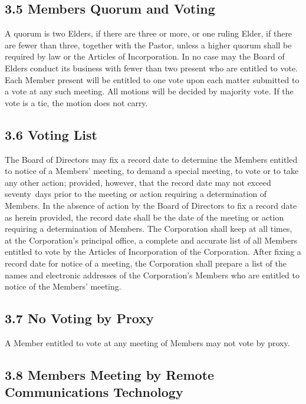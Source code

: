 \documentclass[
]{book}
\begin{document}
\subsection{3.5 Members Quorum and Voting}\label{members-quorum-and-voting}

A quorum is two Elders, if there are three or more, or one ruling
Elder, if there are fewer than three, together with the Pastor, unless
a higher quorum shall be required by law or the Articles of
Incorporation. In no case may the Board of Elders conduct its business
with fewer than two present who are entitled to vote. Each Member
present will be entitled to one vote upon each matter submitted to a
vote at any such meeting. All motions will be decided by majority
vote. If the vote is a tie, the motion does not carry.

\subsection{3.6 Voting List}\label{voting-list}

The Board of Directors may fix a record date to determine the Members
entitled to notice of a Members' meeting, to demand a special meeting,
to vote or to take any other action; provided, however, that the
record date may not exceed seventy~days prior to the meeting or action
requiring a determination of Members. In the absence of action by the
Board of Directors to fix a record date as herein provided, the record
date shall be the date of the meeting or action requiring a
determination of Members. The Corporation shall keep at all times, at
the Corporation's principal office, a complete and accurate list of
all Members entitled to vote by the Articles of Incorporation of the
Corporation. After fixing a record date for notice of a meeting, the
Corporation shall prepare a list of the names and electronic addresses
of the Corporation's Members who are entitled to notice of the
Members' meeting.

\subsection{3.7 No Voting by Proxy}\label{no-voting-by-proxy}

A Member entitled to vote at any meeting of Members may not vote by
proxy.

\subsection{3.8 Members Meeting by Remote Communications Technology}\label{members-meeting-by-remote-communications-technology}
\end{document}
